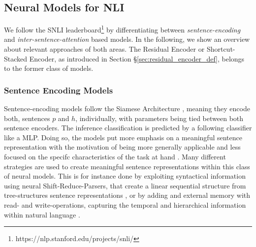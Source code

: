 \subsection{Neural Models for NLI}\label{sec:models_snli}
We follow the \ac{SNLI} leaderboard\footnote{https://nlp.stanford.edu/projects/snli/} by differentiating between \textit{sentence-encoding} and \textit{inter-sentence-attention} based models. In the following, we show an overview about relevant approaches of both areas. The Residual Encoder or Shortcut-Stacked Encoder, as introduced in Section §\ref{sec:residual_encoder_def}, belongs to the former class of models. 
\subsubsection{Sentence Encoding Models}
Sentence-encoding models follow the Siamese Architecture \citep{bromley1994signature}, meaning they encode both, sentences $p$ and $h$, individually, with parameters being tied between both sentence encoders. The inference classification is predicted by a following classifier like a \ac{MLP}. Doing so, the models put more emphasis on a meaningful sentence representation with the motivation of being more generally applicable and less focused on the specifc characteristics of the task at hand \citep{bowman2016fast}. Many different strategies are used to create meaningful sentence representations within this class of neural models. This is for instance done by exploiting syntactical information using neural Shift-Reduce-Parsers, that create a linear sequential structure from tree-structures sentence representations \citep{bowman2016fast}, or by adding and external memory with read- and write-operations, capturing the temporal and hierarchical information within natural language \citep{munkhdalai2017neural}. 


